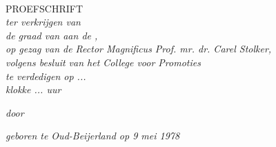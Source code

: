 \documentclass[11pt, a4paper, oneside]{Thesis} %
\title{\ttitle} %
\begin{document}
\frontmatter %


\fancyhead{} %
\rhead{\thepage} %
\lhead{} %

\pagestyle{fancy} %

\newcommand{\HRule}{\rule{\linewidth}{0.5mm}} %

\hypersetup{pdfsubject=\subjectname}
\hypersetup{pdfauthor=\authornames}
\hypersetup{pdfkeywords=\keywordnames}


\begin{titlepage}
\begin{center}

{\huge \bfseries \ttitle}\\[0.4cm] %

\textsc{\Large PROEFSCHRIFT}\\[0.5cm] %

\large \textit{ter verkrijgen van\\
de graad van \degreename{} aan de \univname,\\
op gezag van de Rector Magnificus Prof. mr. dr. Carel Stolker,\\
volgens besluit van het College voor Promoties\\
te verdedigen op ...\\
klokke ... uur}

\large \textit{door}

\authornames

\large \textit{geboren te Oud-Beijerland op 9 mei 1978}
 
\vfill
\end{center}

\end{titlepage}

\end{document}
